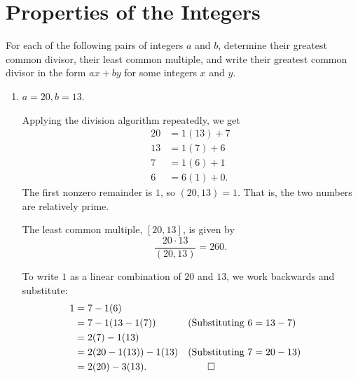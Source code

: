 \section{Properties of the Integers}

 For each of the following pairs of integers $a$ and $b$,
determine their greatest common divisor, their least common multiple,
and write their greatest common divisor in the form $ax + by$ for some
integers $x$ and $y$.
\begin{enumerate}

\item
  $a = 20, b = 13$.
  \begin{solution}
    Applying the division algorithm repeatedly, we get
    \begin{align*}
      20 &= 1(13) + 7 \\
      13 &= 1(7) + 6 \\
      7 &= 1(6) + 1 \\
      6 &= 6(1) + 0.
    \end{align*}
    The first nonzero remainder is $1$, so $(20,13) = 1$. That is, the
    two numbers are relatively prime.

    The least common multiple, $[20, 13]$, is given by
    \begin{equation*}
      \frac{20\cdot13}{(20, 13)} = 260.
    \end{equation*}

    To write $1$ as a linear combination of $20$ and $13$, we work
    backwards and substitute:
    \begin{align*}
      1 &= 7 - 1(6) \\
        &= 7 - 1(13 - 1(7)) && \text{(Substituting $6 = 13 - 7$)} \\
        &= 2(7) - 1(13) \\
        &= 2(20 - 1(13)) - 1(13) && \text{(Substituting $7 = 20 - 13$)} \\
        &= 2(20) - 3(13). && \qedhere
    \end{align*}
  \end{solution}


\end{enumerate}
